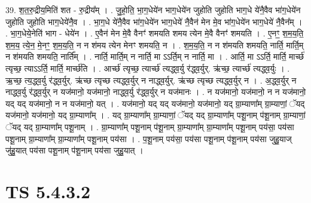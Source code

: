 \documentclass[17pt]{extarticle}
\begin{document}
39. श॒त॒रु॒द्रीय॒मिति॑ शत - रु॒द्रीय᳚म् । . जु॒हो॒ति॒ भा॒ग॒धेये॑न भाग॒धेये॑न जुहोति जुहोति भाग॒धे ये॑नै॒वैव भा॑ग॒धेये॑न जुहोति जुहोति भाग॒धेये॑नै॒व । . भा॒ग॒धे ये॑नै॒वैव भा॑ग॒धेये॑न भाग॒धेये॑ नै॒वैन॑ मेन मे॒व भा॑ग॒धेये॑न भाग॒धेये॑
नै॒वैन᳚म् । . भा॒ग॒धेये॒नेति॑ भाग - धेये॑न । . ए॒वैन॑ मेन मे॒वै वैनꣳ॑ शमयति शमय त्येन मे॒वै वैनꣳ॑ शमयति । . ए॒नꣳ॒॒ श॒म॒य॒ति॒ श॒म॒य॒ त्ये॒न॒ मे॒नꣳ॒॒ श॒म॒य॒ति॒ न न श॑मय त्येन मेनꣳ शमयति॒ न । . श॒म॒य॒ति॒ न न श॑मयति शमयति॒ नार्ति॒ मार्ति॒म् न श॑मयति शमयति॒ नार्ति᳚म् । . नार्ति॒ मार्ति॒म् न नार्ति॒ मा ऽऽर्ति॒म् न नार्ति॒ मा । . आर्ति॒ मा ऽऽर्ति॒ मार्ति॒ मार्च्छ॑ त्यृच्छ॒ त्याऽऽर्ति॒ मार्ति॒ मार्च्छ॑ति । . आर्च्छ॑ त्यृच्छ॒ त्यार्च्छ॑ त्यद्ध्व॒र्यु र॑द्ध्व॒र्युर्. ऋ॑च्छ॒ त्यार्च्छ॑ त्यद्ध्व॒र्युः । . ऋ॒च्छ॒ त्य॒द्ध्व॒र्यु र॑द्ध्व॒र्युर्. ऋ॑च्छ त्यृच्छ त्यद्ध्व॒र्युर् न नाद्ध्व॒र्युर्. ऋ॑च्छ त्यृच्छ त्यद्ध्व॒र्युर् न । . अ॒द्ध्व॒र्युर् न नाद्ध्व॒र्यु र॑द्ध्व॒र्युर् न यज॑मानो॒ यज॑मानो॒ नाद्ध्व॒र्यु र॑द्ध्व॒र्युर् न यज॑मानः । . न यज॑मानो॒ यज॑मानो॒ न न यज॑मानो॒ यद् यद् यज॑मानो॒ न न यज॑मानो॒ यत् । . यज॑मानो॒ यद् यद् यज॑मानो॒ यज॑मानो॒ यद् ग्रा॒म्याणा᳚म् ग्रा॒म्याणां॒ ॅयद् यज॑मानो॒ यज॑मानो॒ यद् ग्रा॒म्याणा᳚म् । . यद् ग्रा॒म्याणा᳚म् ग्रा॒म्याणां॒ ॅयद् यद् ग्रा॒म्याणा᳚म् पशू॒नाम् प॑शू॒नाम् ग्रा॒म्याणां॒ ॅयद् यद् ग्रा॒म्याणा᳚म् पशू॒नाम् । . ग्रा॒म्याणा᳚म् पशू॒नाम् प॑शू॒नाम् ग्रा॒म्याणा᳚म् ग्रा॒म्याणा᳚म् पशू॒नाम् पय॑सा॒ पय॑सा पशू॒नाम् ग्रा॒म्याणा᳚म् ग्रा॒म्याणा᳚म् पशू॒नाम् पय॑सा । . प॒शू॒नाम् पय॑सा॒ पय॑सा पशू॒नाम् प॑शू॒नाम् पय॑सा जुहु॒याज् जु॑हु॒यात् पय॑सा पशू॒नाम् प॑शू॒नाम् पय॑सा जुहु॒यात् । \newline
\pagebreak
{}

\section{ TS 5.4.3.2 }
\end{document}
